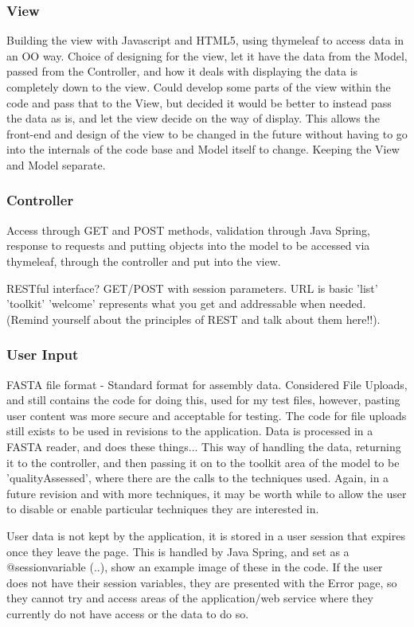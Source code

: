 \subsubsection{View}
Building the view with Javascript and HTML5, using thymeleaf to access data in an OO way.
Choice of designing for the view, let it have the data from the Model, passed from the Controller, and how it deals with displaying the data is completely down to the view. Could develop some parts of the view within the code and pass that to the View, but decided it would be better to instead pass the data as is, and let the view decide on the way of display. This allows the front-end and design of the view to be changed in the future without having to go into the internals of the code base and Model itself to change. Keeping the View and Model separate.
\subsubsection{Controller}
Access through GET and POST methods, validation through Java Spring, response to requests and putting objects into the model to be accessed via thymeleaf, through the controller and put into the view. 

RESTful interface? GET/POST with session parameters. URL is basic 'list' 'toolkit' 'welcome' represents what you get and addressable when needed. (Remind yourself about the principles of REST and talk about them here!!).

\subsubsection{User Input}
FASTA file format - Standard format for assembly data.
Considered File Uploads, and still contains the code for doing this, used for my test files, however, pasting user content was more secure and acceptable for testing. The code for file uploads still exists to be used in revisions to the application.
Data is processed in a FASTA reader, and does these things...
This way of handling the data, returning it to the controller, and then passing it on to the toolkit area of the model to be 'qualityAssessed', where there are the calls to the techniques used. Again, in a future revision and with more techniques, it may be worth while to allow the user to disable or enable particular techniques they are interested in.

User data is not kept by the application, it is stored in a user session that expires once they leave the page. This is handled by Java Spring, and set as a @sessionvariable (..), show an example image of these in the code. If the user does not have their session variables, they are presented with the Error page, so they cannot try and access areas of the application/web service where they currently do not have access or the data to do so.

